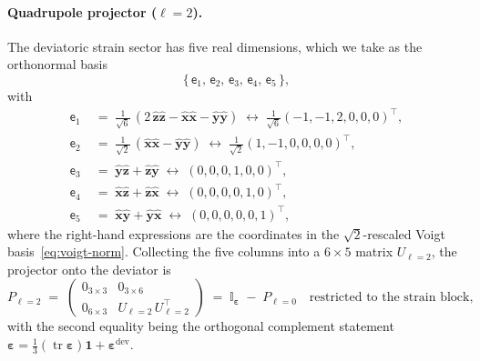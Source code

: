 \documentclass[11pt,a4paper]{article}
\newcommand{\eps}{\varepsilon}
\newcommand{\tr}{\operatorname{tr}}
\newcommand{\dev}{\mathrm{dev}}
\theoremstyle{plain}
\theoremstyle{definition}
\theoremstyle{remark}
\begin{document}
\paragraph{Quadrupole projector ($\ell=2$).}
The deviatoric strain sector has five real dimensions, which we take as
the orthonormal basis
\begin{equation}
  \{\,
    \mathsf{e}_{1},\,\mathsf{e}_{2},\,\mathsf{e}_{3},\,\mathsf{e}_{4},\,\mathsf{e}_{5}
  \,\},
\end{equation}
with
\begin{align}
  \mathsf{e}_{1}
  &\;=\; \tfrac{1}{\sqrt{6}}\,(2\,\hat{\bm{z}}\hat{\bm{z}}
           - \hat{\bm{x}}\hat{\bm{x}} - \hat{\bm{y}}\hat{\bm{y}})
   \;\longleftrightarrow\;
   \tfrac{1}{\sqrt{6}}(-1,-1,2,0,0,0)^\top,
  \\
  \mathsf{e}_{2}
  &\;=\; \tfrac{1}{\sqrt{2}}\,(\hat{\bm{x}}\hat{\bm{x}}-\hat{\bm{y}}\hat{\bm{y}})
   \;\longleftrightarrow\;
   \tfrac{1}{\sqrt{2}}(1,-1,0,0,0,0)^\top,
  \\
  \mathsf{e}_{3}
  &\;=\; \hat{\bm{y}}\hat{\bm{z}}+\hat{\bm{z}}\hat{\bm{y}}
   \;\longleftrightarrow\;
   (0,0,0,1,0,0)^\top,
  \\
  \mathsf{e}_{4}
  &\;=\; \hat{\bm{x}}\hat{\bm{z}}+\hat{\bm{z}}\hat{\bm{x}}
   \;\longleftrightarrow\;
   (0,0,0,0,1,0)^\top,
  \\
  \mathsf{e}_{5}
  &\;=\; \hat{\bm{x}}\hat{\bm{y}}+\hat{\bm{y}}\hat{\bm{x}}
   \;\longleftrightarrow\;
   (0,0,0,0,0,1)^\top,
\end{align}
where the right-hand expressions are the coordinates in the
$\sqrt{2}$-rescaled Voigt basis~\eqref{eq:voigt-norm}.  Collecting the
five columns into a $6\times 5$ matrix $U_{\ell=2}$, the projector onto
the deviator is
\begin{equation}
  P_{\ell=2}
  \;=\;
  \begin{pmatrix}
    0_{3\times 3} & 0_{3\times 6}\\
    0_{6\times 3} & U_{\ell=2}\,U_{\ell=2}^{\!\top}
  \end{pmatrix}
  \;=\;
  \mathbb{I}_{\bm{\eps}} \;-\; P_{\ell=0}
  \quad\text{restricted to the strain block},
  \label{eq:P2}
\end{equation}
with the second equality being the orthogonal complement statement
$\bm{\eps} = \tfrac{1}{3}(\tr\bm{\eps})\bm{1} + \bm{\eps}^{\dev}$.
\end{document}
